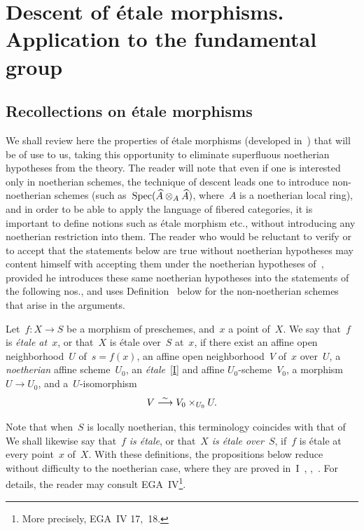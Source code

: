 \chapter[Descent of \'etale morphisms]{Descent of \'etale morphisms.\\ Application to the fundamental group}
\label{IX}

\section{Recollections on \'etale morphisms}
\label{IX.1}

We shall review here the properties of \'etale morphisms
(developed in~) that will be of use to us, taking this
opportunity to eliminate superfluous noetherian hypotheses from
the theory. The reader will note that even if one is interested
only in noetherian schemes, the technique of descent leads one to
introduce non-noetherian schemes
(such as~$\operatorname{Spec}(\widehat{A}\otimes_{A}\widehat{A})$,
where~$A$ is a noetherian local ring), and in order to be able to
apply the language of fibered categories, it is important to
define notions such as \'etale morphism etc., without introducing
any noetherian restriction into them. The reader who would be
reluctant to verify or to accept that the statements below are
true without noetherian hypotheses may content himself with
accepting them under the noetherian hypotheses of~,
provided he introduces these same noetherian hypotheses into the
statements of the following nos., and uses
Definition~ below for the non-noetherian schemes that
arise in the arguments.

\begin{definition}
\label{IX.1.1}
Let~$f\colon X\to S$ be a morphism of preschemes, and~$x$ a
point of~$X$. We say that~$f$ is \emph{\'etale at}~$x$,
or that~$X$ is \'etale over~$S$ at~$x$, if there exist an affine
open neighborhood~$U$ of~$s=f(x)$, an affine open neighborhood~$V$
of~$x$ over~$U$, a \emph{noetherian} affine scheme~$U_{0}$,
an \emph{\'etale}~\eqref{I} and affine $U_{0}$-scheme~$V_{0}$, a
morphism~$U\to U_{0}$, and a~$U$-isomorphism
$$
V\overset{\sim}{\longrightarrow} V_{0}\times_{U_{0}}U.
$$
\end{definition}

Note
that when~$S$ is locally noetherian, this terminology coincides
with that of \loccit We shall likewise say that~$f$ \emph{is
\'etale}, or that~$X$ \emph{is \'etale over}~$S$, if~$f$ is
\'etale at every point~$x$ of~$X$. With these definitions, the
propositions below reduce without difficulty to the noetherian
case, where they are proved in~I~\No {},
,~. For details, the reader may
consult EGA~IV\footnote{More precisely, EGA~IV 17,~18.}.

